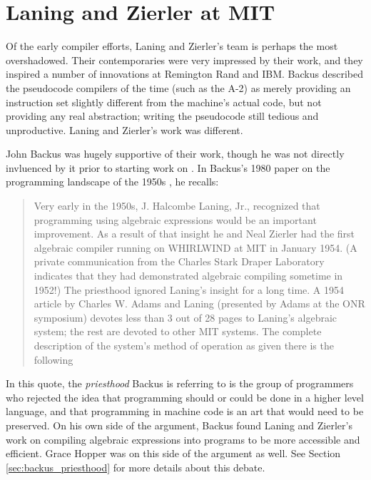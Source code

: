 

\section{Laning and Zierler at MIT}
\label{sec:laning-zierler}

Of the early compiler efforts, Laning and Zierler's team is perhaps the most overshadowed.
Their contemporaries were very impressed by their work, and they inspired a number
of innovations at Remington Rand and IBM.
Backus described the pseudocode compilers of the time (such as the A-2)
as merely providing an instruction set
slightly different from the machine's actual code, but not providing any real abstraction;
writing the pseudocode still tedious and unproductive.
Laning and Zierler's work was different.

John Backus was hugely supportive of their work, though he was not directly invluenced by it
prior to starting work on .
In Backus's 1980 paper on the programming landscape of the 1950s
, he recalls:

\begin{quotation}
	Very early in the 1950s, J. Halcombe Laning, Jr., recognized that
	programming using algebraic expressions would be an important improvement.
	As a result of that insight he and Neal Zierler had the first
	algebraic compiler running on WHIRLWIND at MIT in January 1954.
	(A private communication from the Charles Stark Draper Laboratory indicates
	that they had demonstrated algebraic compiling sometime in 1952!) The priesthood
	ignored Laning's insight for a long time. A 1954 article by Charles W. Adams
	and Laning (presented by Adams at the ONR symposium) devotes less than
	3 out of 28 pages to Laning's algebraic system; the rest are devoted to other
	MIT systems. The complete description of the system's method of operation
	as given there is the following
\end{quotation}

In this quote, the \textit{priesthood} Backus is referring to is the group of programmers
who rejected the idea that programming should or could be done in a higher level language,
and that programming in machine code is an art that would need to be preserved.
On his own side of the argument, Backus found Laning and Zierler's work on compiling
algebraic expressions into programs to be more accessible and efficient.
Grace Hopper was on this side of the argument as well.
See Section \ref{sec:backus_priesthood} for more details about this debate.

